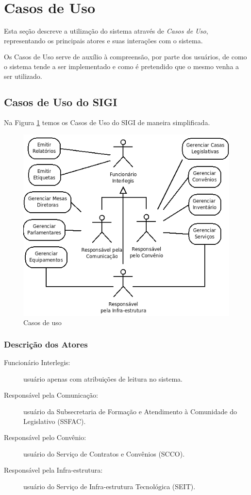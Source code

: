 %
%

\section{Casos de Uso}
\label{sec:casos}

Esta seção descreve a utilização do sistema através de \emph{Casos de
  Uso}, representando os principais atores e suas interações com o
sistema.

Os Casos de Uso serve de auxílio à compreensão, por parte dos
usuários, de como o sistema tende a ser implementado e como é
pretendido que o mesmo venha a ser utilizado.

\subsection{Casos de Uso do SIGI}
Na Figura \ref{fig:casos} temos os Casos de Uso do SIGI de maneira
simplificada.

\begin{figure}[h]
  \centering
  \includegraphics[width=120mm]{../imagens/casosdeuso.png}
  \caption{Casos de uso}
  \label{fig:casos}
\end{figure}

\subsubsection{Descrição dos Atores}
\begin{description}
\item[Funcionário Interlegis:] usuário apenas com atribuições de
  leitura no sistema.
\item[Responsável pela Comunicação:] usuário da Subsecretaria de
  Formação e Atendimento à Comunidade do Legislativo (SSFAC).
\item[Responsável pelo Convênio:] usuário do Serviço de Contratos e
  Convênios (SCCO).
\item[Responsável pela Infra-estrutura:] usuário do Serviço de
  Infra-estrutura Tecnológica (SEIT).
\end{description}

